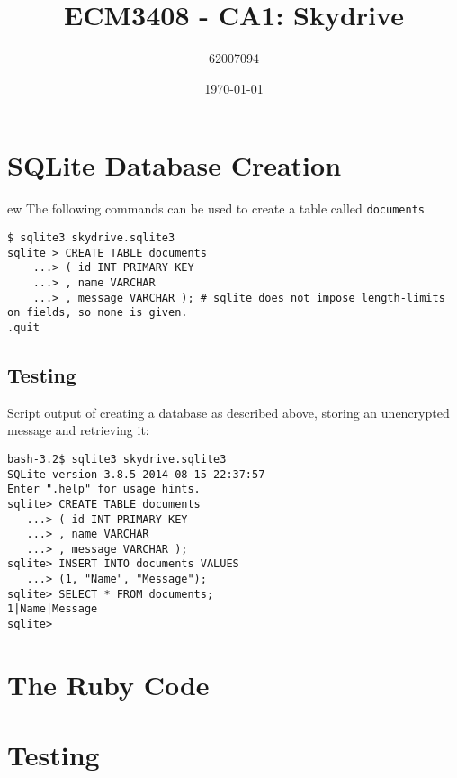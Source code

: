 \documentclass[11pt]{article}
\begin{document}
    \lstset{
    	breaklines=true,
		numbers=left,
		showspaces=false, 
		showstringspaces=false,
    }
    \title{ECM3408 - CA1: Skydrive}
    \author{62007094}
    \date{\today}
    \maketitle
    
    \section{SQLite Database Creation} ew
    The following commands can be used to create a table called \texttt{documents}
    
    \begin{lstlisting}[basicstyle=\ttfamily]
$ sqlite3 skydrive.sqlite3
sqlite > CREATE TABLE documents
    ...> ( id INT PRIMARY KEY 
    ...> , name VARCHAR
    ...> , message VARCHAR ); # sqlite does not impose length-limits on fields, so none is given.
.quit
    \end{lstlisting}
	
	\subsection{Testing}
	Script output of creating a database as described above, storing an unencrypted message and retrieving it:
	\begin{lstlisting}[basicstyle=\ttfamily]
bash-3.2$ sqlite3 skydrive.sqlite3
SQLite version 3.8.5 2014-08-15 22:37:57
Enter ".help" for usage hints.
sqlite> CREATE TABLE documents
   ...> ( id INT PRIMARY KEY
   ...> , name VARCHAR
   ...> , message VARCHAR );
sqlite> INSERT INTO documents VALUES
   ...> (1, "Name", "Message");
sqlite> SELECT * FROM documents;
1|Name|Message
sqlite>
\end{lstlisting}

\section{The Ruby Code}

\section{Testing}
\end{document}
